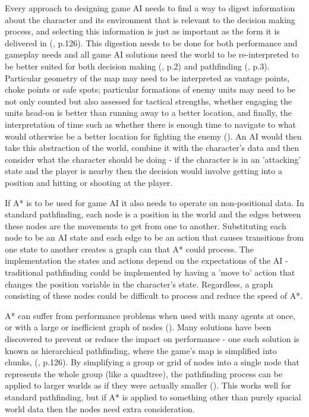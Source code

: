 \documentclass[11pt, a4paper]{article}
\begin{document}
Every approach to designing game AI needs to find a way to digest information about the character and its environment that is relevant to the decision making process, and selecting this information is just as important as the form it is delivered in (\cite{cui2011based}, p.126). This digestion needs to be done for both performance and gameplay needs and all game AI solutions need the world to be re-interpreted to be better suited for both decision making (\cite{buro2004call}, p.2) and pathfinding (\cite{diller2004behavior}, p.3). Particular geometry of the map may need to be interpreted as vantage points, choke points or safe spots; particular formations of enemy units may need to be not only counted but also assessed for tactical strengths, whether engaging the units head-on is better than running away to a better location, and finally, the interpretation of time such as whether there is enough time to navigate to what would otherwise be a better location for fighting the enemy (\cite{buro2004call}). An AI would then take this abstraction of the world, combine it with the character's data and then consider what the character should be doing - if the character is in an 'attacking' state and the player is nearby then the decision would involve getting into a position and hitting or shooting at the player. 

If A* is to be used for game AI it also needs to operate on non-positional data. In standard pathfinding, each node is a position in the world and the edges between these nodes are the movements to get from one to another. Substituting each node to be an AI state and each edge to be an action that causes transitions from one state to another creates a graph can that A* could process. The implementation the states and actions depend on the expectations of the AI - traditional pathfinding could be implemented by having a 'move to' action that changes the position variable in the character's state. Regardless, a graph consisting of these nodes could be difficult to process and reduce the speed of A*.

A* can suffer from performance problems when used with many agents at once, or with a large or inefficient graph of nodes (\cite{graham2003pathfinding}). Many solutions have been discovered to prevent or reduce the impact on performance - one such solution is known as hierarchical pathfinding, where the game's map is simplified into chunks, (\cite{cui2011based}, p.126). By simplifying a group or grid of nodes into a single node that represents the whole group (like a quadtree), the pathfinding process can be applied to larger worlds as if they were actually smaller (\cite{botea2004near}). This works well for standard pathfinding, but if A* is applied to something other than purely spacial world data then the nodes need extra consideration. 
\end{document}
